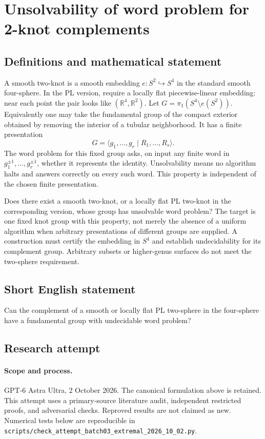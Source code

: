 \documentclass[11pt,a4paper]{article}
\begin{document}
\section*{Unsolvability of word problem for 2-knot complements}\label{statement}

\subsection{Definitions and mathematical statement}
A smooth two-knot is a smooth embedding $e:S^2\hookrightarrow S^4$
in the standard smooth four-sphere. In the PL version, require a
locally flat piecewise-linear embedding: near each point the pair
looks like $(\mathbb R^4,\mathbb R^2)$. Let
$G=\pi_1(S^4\setminus e(S^2))$. Equivalently one may take the
fundamental group of the compact exterior obtained by removing
the interior of a tubular neighborhood. It has a finite presentation
\[
                   G=\langle g_1,\ldots,g_r\mid R_1,\ldots,R_s\rangle.
\]
The word problem for this fixed group asks, on input any finite
word in $g_1^{\pm1},\ldots,g_r^{\pm1}$, whether it represents the
identity. Unsolvability means no algorithm halts and answers correctly
on every such word. This property is independent of the chosen
finite presentation.

Does there exist a smooth two-knot, or a locally flat PL two-knot
in the corresponding version, whose group has unsolvable word
problem? The target is one fixed knot group with this property,
not merely the absence of a uniform algorithm when arbitrary
presentations of different groups are supplied. A construction must
certify the embedding in $S^4$ and establish undecidability for
its complement group. Arbitrary subsets or higher-genus surfaces
do not meet the two-sphere requirement.
\subsection{Short English statement}
Can the complement of a smooth or locally flat PL two-sphere in the four-sphere have a fundamental group with undecidable word problem?
\subsection{Research attempt}
\paragraph{Scope and process.}
GPT-6 Astra Ultra, 2 October 2026. The canonical formulation above is retained. This attempt uses a primary-source literature audit, independent restricted proofs, and adversarial checks. Reproved results are not claimed as new. Numerical tests below are reproducible in \texttt{scripts/check\_attempt\_batch03\_extremal\_2026\_10\_02.py}.
\end{document}
